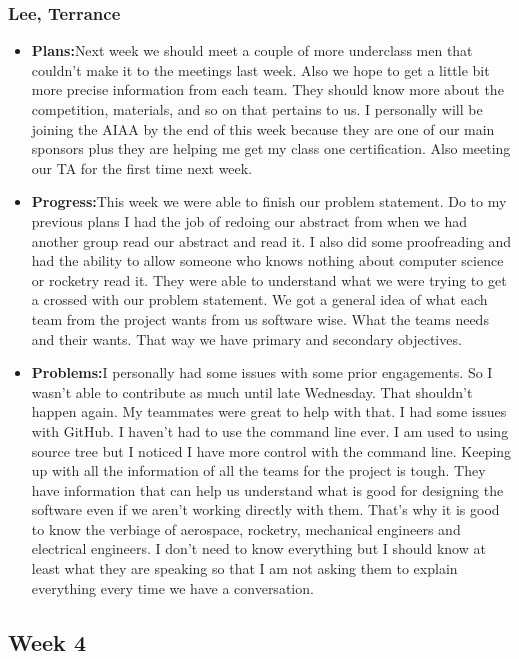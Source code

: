 \documentclass[10pt,draftclsnofoot,onecolumn]{IEEEtran}
\begin{document}
\subsubsection{Lee, Terrance}
\begin{itemize}
	\item \textbf{Plans:}Next week we should meet a couple of more underclass men that couldn't make it to the meetings last week. Also we hope to get a little bit more precise information from each team. They should know more about the competition, materials, and so on that pertains to us. I personally will be joining the AIAA by the end of this week because they are one of our main sponsors plus they are helping me get my class one certification. Also meeting our TA for the first time next week.
	\item \textbf{Progress:}This week we were able to finish our problem statement. Do to my previous plans I had the job of redoing our abstract from when we had another group read our abstract and read it. I also did some proofreading and had the ability to allow someone who knows nothing about computer science or rocketry read it. They were able to understand what we were trying to get a crossed with our problem statement. We got a general idea of what each team from the project wants from us software wise. What the teams needs and their wants. That way we have primary and secondary objectives.
	\item \textbf{Problems:}I personally had some issues with some prior engagements. So I wasn't able to contribute as much until late Wednesday. That shouldn't happen again. My teammates were great to help with that. I had some issues with GitHub. I haven't had to use the command line ever. I am used to using source tree but I noticed I have more control with the command line. Keeping up with all the information of all the teams for the project is tough. They have information that can help us understand what is good for designing the software even if we aren't working directly with them. That's why it is good to know the verbiage of aerospace, rocketry, mechanical engineers and electrical engineers. I don't need to know everything but I should know at least what they are speaking so that I am not asking them to explain everything every time we have a conversation.
\end{itemize}
\subsection{Week 4}
\end{document}
